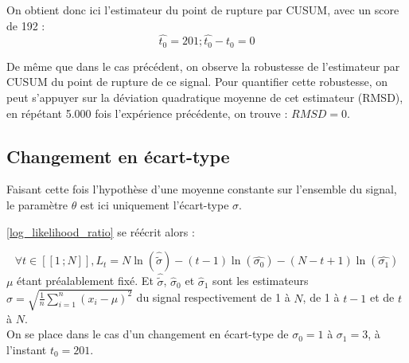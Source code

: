 \documentclass[french,11pt,notitlepage]{report}
\begin{document}
	On obtient donc ici l'estimateur du point de rupture par CUSUM, avec un score de 192 :
	\begin{equation*}
		\hat{t_0} = 201 ; \hat{t_0} - t_0 = 0
	\end{equation*}
	
	De même que dans le cas précédent, on observe la robustesse de l'estimateur par CUSUM du point de rupture de ce signal. Pour quantifier cette robustesse, on peut s'appuyer sur la déviation quadratique moyenne de cet estimateur (RMSD), en répétant 5.000 fois l'expérience précédente, on trouve : $RMSD = 0$.
	
	
	\subsection{Changement en écart-type}
	
	
	Faisant cette fois l'hypothèse d'une moyenne constante sur l'ensemble du signal, le paramètre $\theta$ est ici uniquement l'écart-type $\sigma$.
	
	\ref{log_likelihood_ratio} se réécrit alors : 
	
	\begin{equation}
		\forall t \in [\![1\,; N]\!], L_t = N\ln (\hat{\tilde\sigma}) - (t-1)\ln (\hat{\sigma_0}) - (N-t+1)\ln (\hat{\sigma_1})
		\label{stdchange}
	\end{equation}
	$\mu$ étant préalablement fixé. Et $\hat{\tilde\sigma}$, $\hat\sigma_0$ et $\hat\sigma_1$ sont les estimateurs $\hat\sigma=\sqrt{\frac1n\sum_{i=1}^n(x_i-\mu)^2}$ du signal respectivement de 1 à $N$, de 1 à $t-1$ et de $t$ à $N$.
	\\
	
		On se place dans le cas d'un changement en écart-type de $\sigma_0 = 1$ à $\sigma_1 = 3$, à l'instant $t_0 = 201$.
	
\end{document}
